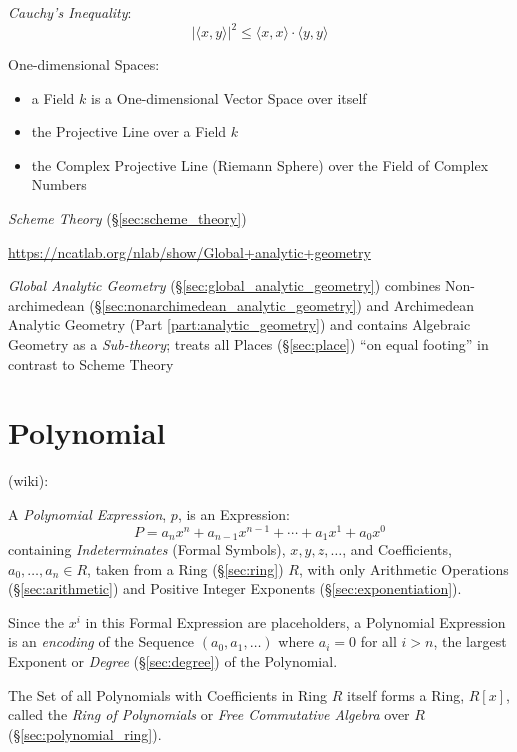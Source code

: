 \emph{Cauchy's Inequality}:
\[
    |\langle x,y \rangle|^2 \leq \langle x,x \rangle \cdot \langle
    y,y \rangle
\]

One-dimensional Spaces:
\begin{itemize}
\item a Field $k$ is a One-dimensional Vector Space over itself
\item the Projective Line over a Field $k$
\item the Complex Projective Line (Riemann Sphere) over the Field of Complex
  Numbers
\end{itemize}

\emph{Scheme Theory} (\S\ref{sec:scheme_theory})

\url{https://ncatlab.org/nlab/show/Global+analytic+geometry}

\emph{Global Analytic Geometry} (\S\ref{sec:global_analytic_geometry}) combines
Non-archimedean (\S\ref{sec:nonarchimedean_analytic_geometry}) and Archimedean
Analytic Geometry (Part \ref{part:analytic_geometry}) and contains Algebraic
Geometry as a \emph{Sub-theory}; treats all Places (\S\ref{sec:place}) ``on
equal footing'' in contrast to Scheme Theory



\section{Polynomial}\label{sec:polynomial}

(wiki):

A \emph{Polynomial Expression}, $p$, is an Expression:
\[
  P = a_n x^n + a_{n-1}x^{n-1} + \cdots + a_1 x^1 + a_0 x^0
\]
containing \emph{Indeterminates} (Formal Symbols), $x, y, z, \ldots$, and
Coefficients, $a_0, \ldots, a_n \in R$, taken from a Ring (\S\ref{sec:ring})
$R$, with only Arithmetic Operations (\S\ref{sec:arithmetic}) and Positive
Integer Exponents (\S\ref{sec:exponentiation}).

Since the $x^i$ in this Formal Expression are placeholders, a Polynomial
Expression is an \emph{encoding} of the Sequence $(a_0, a_1, \ldots)$ where $a_i
= 0$ for all $i > n$, the largest Exponent or \emph{Degree} (\S\ref{sec:degree})
of the Polynomial.

The Set of all Polynomials with Coefficients in Ring $R$ itself forms a Ring,
$R[x]$, called the \emph{Ring of Polynomials} or \emph{Free Commutative Algebra}
over $R$ (\S\ref{sec:polynomial_ring}).

